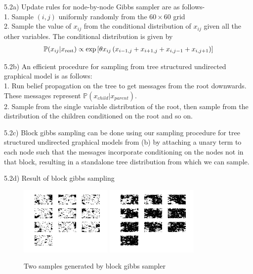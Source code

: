\documentclass[10pt,onecolumn,letterpaper]{article}
\begin{document}
\pagebreak
5.2a) Update rules for node-by-node Gibbs sampler are as follows- \\
1. Sample $(i,j)$ uniformly randomly from the $60\times 60$ grid \\
2. Sample the value of $x_{ij}$ from the conditional distribution of $x_{ij}$ given all the other variables. The conditional distribution is given by
\begin{align*}
\mathbb{P}(x_{ij}|x_{\rm rest}) \propto \exp \left[ \theta x_{ij}\left(x_{i-1,j} + x_{i+1,j} + x_{i,j-1} + x_{i,j+1}\right) \right]
\end{align*}

5.2b) An efficient procedure for sampling from tree structured undirected graphical model is as follows: \\
1. Run belief propagation on the tree to get messages from the root downwards. These messages represent $\mathbb{P}(x_{child}|x_{parent})$. \\
2. Sample from the single variable distribution of the root, then sample from the distribution of the children conditioned on the root and so on.  

5.2c) Block gibbs sampling can be done using our sampling procedure for tree structured undirected graphical models from (b) by attaching a unary term to each node such that the messages incorporate conditioning on the nodes not in that block, resulting in a standalone tree distribution from which we can sample.

5.2d) Result of block gibbs sampling
\begin{figure}[htbp]
  \centering
    \includegraphics[width=0.4\textwidth]{Images/block_1.png}
    \hfill
	\includegraphics[width=0.4\textwidth]{Images/block_3.png}
    \caption{Two samples generated by block gibbs sampler} 
\end{figure}
\end{document}
